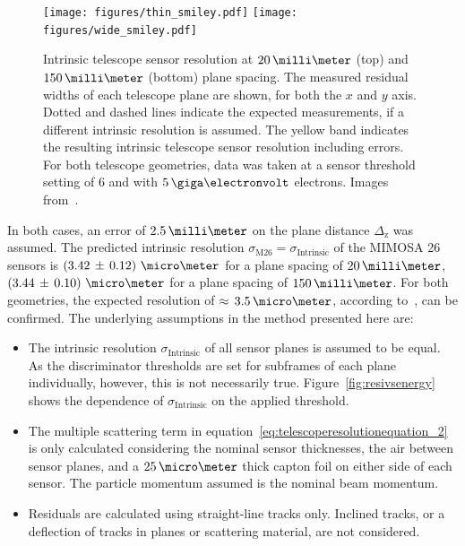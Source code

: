 \begin{figure}[tbp]
\centering
\texttt{[image: figures/thin\_smiley.pdf]}
\texttt{[image: figures/wide\_smiley.pdf]}
\caption[Intrinsic telescope sensor resolution at $20\,\milli\meter$ and $150\,\milli\meter$ plane spacing~\cite{ref:thomas}]{Intrinsic telescope sensor resolution at $20\,\milli\meter$ (top) and $150\,\milli\meter$ (bottom) plane spacing.
The measured residual widths of each telescope plane are shown, for both the $x$ and $y$ axis. Dotted and dashed lines indicate the expected measurements, if a different intrinsic resolution is assumed.
The yellow band indicates the resulting intrinsic telescope sensor resolution including errors.
For both telescope geometries, data was taken at a sensor threshold setting of $6$ and with $5\,\giga\electronvolt$ electrons.
Images from~\cite{ref:thomas}.}
\label{fig:smiley}
\end{figure}

In both cases, an error of $2.5\,\milli\meter$ on the plane distance $\Delta_{\textrm{z}}$ was assumed.
The predicted intrinsic resolution $\sigma_{\textrm{M26}} = \sigma_{\textrm{Intrinsic}}$ of the MIMOSA 26 sensors is \allowbreak$\left( 3.42\,\pm\, \allowbreak 0.12 \right)\,\micro\meter$ for a plane spacing of
$20\,\milli\meter$, $\left( 3.44\,\pm\,0.10 \right)\,\micro\meter$ for a plane spacing of $150\,\milli\meter$.
For both geometries, the expected resolution of $\approx\,3.5\,\micro\meter$, according to~\cite{ref:mimosa26}, can be confirmed.
The underlying assumptions in the method presented here are:

\begin{itemize}
\item The intrinsic resolution $\sigma_{\textrm{Intrinsic}}$ of all sensor planes is assumed to be equal.
As the discriminator thresholds are set for subframes of each plane individually, however, this is not necessarily true.
Figure~\ref{fig:resivsenergy} shows the dependence of $\sigma_{\textrm{Intrinsic}}$ on the applied threshold.

\item The multiple scattering term in equation~\ref{eq:telescoperesolutionequation_2} is only calculated considering the nominal sensor thicknesses, the air between sensor planes, and a $25\,\micro\meter$ thick capton foil on either side of each sensor.
The particle momentum assumed is the nominal beam momentum.

\item Residuals are calculated using straight-line tracks only.
Inclined tracks, or a deflection of tracks in planes or scattering material, are not considered.
\end{itemize}

